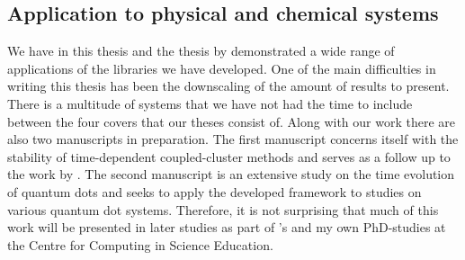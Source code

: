         \subsection{Application to physical and chemical systems}
            We have in this thesis and the thesis by \citeauthor{greg-winther}
            \cite{greg-winther} demonstrated a wide range of applications of the
            libraries we have developed.
            One of the main difficulties in writing this thesis has been the
            downscaling of the amount of results to present.
            There is a multitude of systems that we have not had the time to
            include between the four covers that our theses consist of.
            Along with our work there are also two manuscripts in preparation.
            The first manuscript concerns itself with the stability of
            time-dependent coupled-cluster methods \cite{oa-stability} and
            serves as a follow up to the work by
            \citeauthor{pedersen2018symplectic} \cite{pedersen2018symplectic}.
            The second manuscript is an extensive study on the time evolution of
            quantum dots \cite{td-quantum-dots} and seeks to apply the developed
            framework to studies on various quantum dot systems.
            Therefore, it is not surprising that much of this work will be
            presented in later studies as part of \citeauthor{greg-winther}'s
            and my own PhD-studies at the Centre for Computing in Science
            Education.

